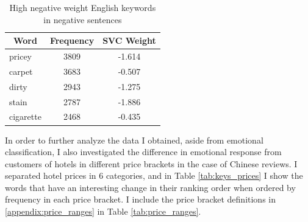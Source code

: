 \documentclass[review]{elsarticle}
\begin{document}
\begin{table}[bp]
\centering
\caption{High negative weight English keywords in negative sentences}
\label{tab:neg_keys_en}
\begin{tabular}{|l|c|c|}
\hline
\multicolumn{1}{|c|}{\textbf{Word}} & \textbf{Frequency} & \textbf{SVC Weight} \\ \hline
pricey & 3809 & -1.614 \\ \hline
carpet & 3683 & -0.507 \\ \hline
dirty & 2943 & -1.275 \\ \hline
stain & 2787 & -1.886 \\ \hline
cigarette & 2468 & -0.435 \\ \hline
\end{tabular}
\end{table}

In order to further analyze the data I obtained, aside from emotional classification, I also investigated the difference in emotional response from customers of hotels in different price brackets in the case of Chinese reviews. I separated hotel prices in 6 categories, and in Table \ref{tab:keys_prices} I show the words that have an interesting change in their ranking order when ordered by frequency in each price bracket. I include the price bracket definitions in \ref{appendix:price_ranges} in Table \ref{tab:price_ranges}.
\end{document}
